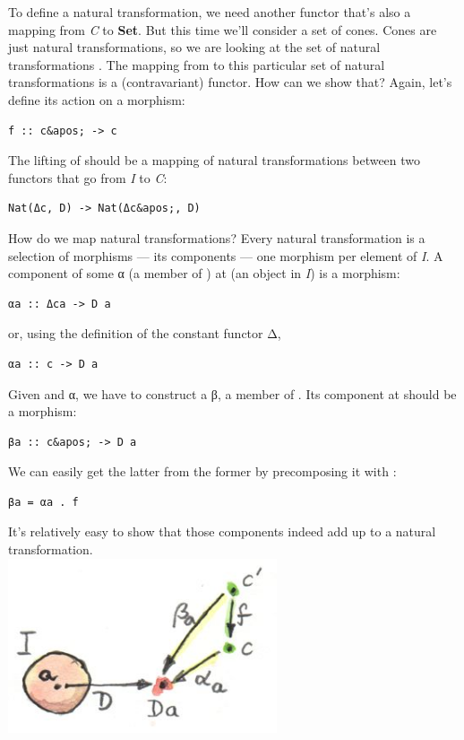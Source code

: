 To define a natural transformation, we need another functor that's also
a mapping from \emph{C} to \textbf{Set}. But this time we'll consider a
set of cones. Cones are just natural transformations, so we are looking
at the set of natural transformations . The mapping
from  to this particular set of natural transformations is a
(contravariant) functor. How can we show that? Again, let's define its
action on a morphism:

\begin{verbatim}
f :: c&apos; -> c
\end{verbatim}

The lifting of  should be a mapping of natural transformations
between two functors that go from \emph{I} to \emph{C}:

\begin{verbatim}
Nat(Δc, D) -> Nat(Δc&apos;, D)
\end{verbatim}

How do we map natural transformations? Every natural transformation is a
selection of morphisms --- its components --- one morphism per element
of \emph{I}. A component of some α (a member of ) at
 (an object in \emph{I}) is a morphism:

\begin{verbatim}
αa :: Δca -> D a
\end{verbatim}

or, using the definition of the constant functor Δ,

\begin{verbatim}
αa :: c -> D a
\end{verbatim}

Given  and α, we have to construct a β, a member of
. Its component at  should be a
morphism:

\begin{verbatim}
βa :: c&apos; -> D a
\end{verbatim}

We can easily get the latter from the former by precomposing it with
:

\begin{verbatim}
βa = αa . f
\end{verbatim}

It's relatively easy to show that those components indeed add up to a
natural transformation.\\
\includegraphics[width=3.12500in]{images/natmapping.jpg}

